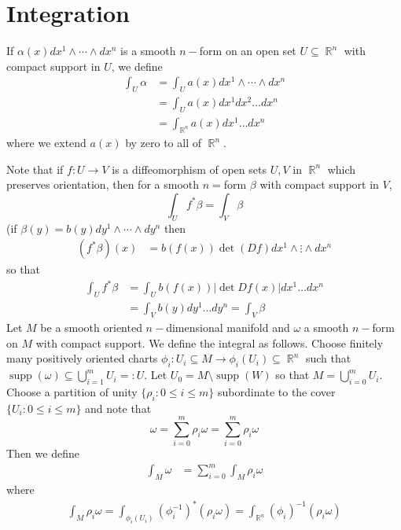 \documentclass[11pt, a4paper]{memoir}
\DeclareMathOperator{\R}{{\mathbb{R}}}
\theoremstyle{change}
\theoremstyle{plain}
\theoremstyle{nonumberplain}
\DeclareMathOperator{\supp}{supp}
\numberwithin{equation}{section}
\begin{document}
\section{Integration}
If $\alpha(x)dx^1\wedge\cdots\wedge dx^n$ is a smooth $n-$form on an open set $U\subseteq\R^n$ with compact support in $U$, we define
\begin{align*}
    \int_U\alpha&=\int_U a(x)dx^1\wedge\cdots\wedge dx^n\\
                &=\int_Ua(x)dx^1dx^2\ldots dx^n\\
                &= \int_{\R^n}a(x)dx^1\ldots dx^n
\end{align*}
where we extend $a(x)$ by zero to all of $\R^n$.

Note that if $f:U\to V$ is a diffeomorphism of open sets $U,V$ in $\R^n$ which preserves orientation, then for a smooth $n=$form $\beta$ with compact support in $V$,
\begin{equation*}
    \int_Uf^*\beta=\int_V\beta
\end{equation*}
(if $\beta(y)=b(y)dy^1\wedge\cdots\wedge dy^n$ then
\begin{align*}
    (f^*\beta)(x)&=b(f(x))\det(Df)dx^1\wedge\vdots\wedge dx^n
\end{align*}
so that
\begin{align*}
    \int_Uf^*\beta&= \int_Ub(f(x))\left\lvert\det Df(x)\right\rvert dx^1\ldots dx^n\\
                  &= \int_V b(y)dy^1\ldots dy^n=\int_V\beta
\end{align*}
Let $M$ be a smooth oriented $n-$dimensional manifold and $\omega$ a smooth $n-$form on $M$ with compact support.
We define the integral as follows.
Choose finitely many positively oriented charts $\phi_i:U_i\subseteq M\to\phi_i(U_i)\subseteq\R^n$ such that $\supp(\omega)\subseteq\bigcup_{i=1}^m U_i=:U$.
Let $U_0=M\setminus\supp(W)$ so that $M=\bigcup_{i=0}^mU_i$.
Choose a partition of unity $\{\rho_i:0\leq i\leq m\}$ subordinate to the cover $\{U_i:0\leq i\leq m\}$ and note that
\begin{equation*}
    \omega=\sum_{i=0}^m\rho_i\omega=\sum_{i=0}^m\rho_i\omega
\end{equation*}
Then we define
\begin{align*}
    \int_M\omega &= \sum_{i=0}^m\int_M\rho_i\omega
\end{align*}
where
\begin{align*}
    \int_M\rho_i\omega=\int_{\phi_i(U_i)}(\phi_i^{-1})^*(\rho_i\omega)=\int_{\R^n}(\phi_i)^{-1}(\rho_i\omega)
\end{align*}
\end{document}
